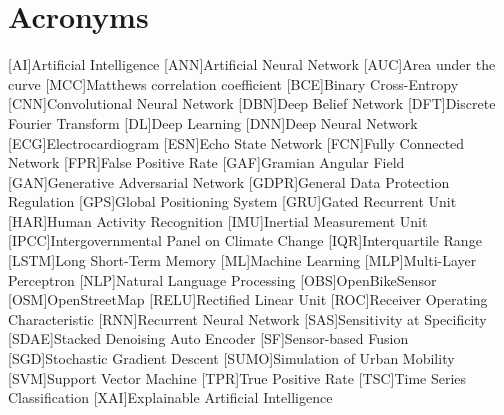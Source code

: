 
\cleardoublepage
{}
\section*{Acronyms}

\acresetall

\begin{acronym}[Bash]
	[AI]{Artificial Intelligence}
	[ANN]{Artificial Neural Network}
	[AUC]{Area under the curve}
	[MCC]{Matthews correlation coefficient}
	[BCE]{Binary Cross-Entropy}
	[CNN]{Convolutional Neural Network}
	[DBN]{Deep Belief Network}
	[DFT]{Discrete Fourier Transform}
	[DL]{Deep Learning}
	[DNN]{Deep Neural Network}
	[ECG]{Electrocardiogram}
	[ESN]{Echo State Network}
	[FCN]{Fully Connected Network}
	[FPR]{False Positive Rate}
	[GAF]{Gramian Angular Field}
	[GAN]{Generative Adversarial Network}
	[GDPR]{General Data Protection Regulation}
	[GPS]{Global Positioning System}
	[GRU]{Gated Recurrent Unit}
	[HAR]{Human Activity Recognition}
	[IMU]{Inertial Measurement Unit}
	[IPCC]{Intergovernmental Panel on Climate Change}
	[IQR]{Interquartile Range}
	[LSTM]{Long Short-Term Memory}	
	[ML]{Machine Learning}
	[MLP]{Multi-Layer Perceptron}
	[NLP]{Natural Language Processing}
	[OBS]{OpenBikeSensor}
	[OSM]{OpenStreetMap}
	[RELU]{Rectified Linear Unit}
	[ROC]{Receiver Operating Characteristic}
	[RNN]{Recurrent Neural Network}
	[SAS]{Sensitivity at Specificity}
	[SDAE]{Stacked Denoising Auto Encoder}
	[SF]{Sensor-based Fusion}
	[SGD]{Stochastic Gradient Descent}
	[SUMO]{Simulation of Urban Mobility}
	[SVM]{Support Vector Machine}
	[TPR]{True Positive Rate}
	[TSC]{Time Series Classification}
	[XAI]{Explainable Artificial Intelligence}
\end{acronym}

\acresetall